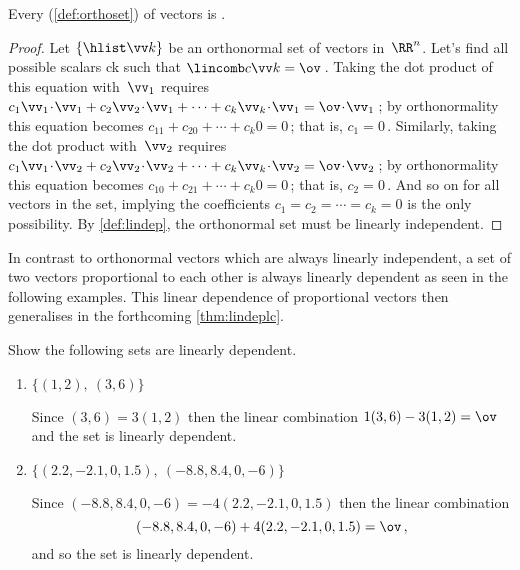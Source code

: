 \begin{theorem} \label{thm:ortholi}
Every  (\autoref{def:orthoset}) of vectors is .
\end{theorem}
\begin{proof} %
Let \(\{\hlist\vv k\}\) be an orthonormal set of vectors in~\(\RR^n\).
Let's find all possible scalars \hlist ck such that \(\lincomb c\vv k=\ov\)\,.
Taking the dot product of this equation with~\(\vv_1\) requires
\(c_1\vv_1\cdot\vv_1+c_2\vv_2\cdot\vv_1+\cdots+c_k\vv_k\cdot\vv_1=\ov\cdot\vv_1\)\,;
by orthonormality this equation becomes
\(c_11+c_20+\cdots+c_k0=0\)\,; that is, \(c_1=0\)\,.
Similarly, taking the dot product with~\(\vv_2\) requires
\(c_1\vv_1\cdot\vv_2+c_2\vv_2\cdot\vv_2+\cdots+c_k\vv_k\cdot\vv_2=\ov\cdot\vv_2\)\,;
by orthonormality this equation becomes
\(c_10+c_21+\cdots+c_k0=0\)\,; that is, \(c_2=0\)\,.
And so on for all vectors in the set, implying the coefficients \(c_1=c_2=\cdots=c_k=0\) is the only possibility.
By \autoref{def:lindep}, the orthonormal set must be linearly independent.
\end{proof}


In contrast to orthonormal vectors which are always linearly independent, a set of two vectors proportional to each other is always linearly dependent as seen in the following examples.
This linear dependence of proportional vectors then generalises in the forthcoming \autoref{thm:lindeplc}.




\begin{example} \label{eg:}
Show the following sets are linearly dependent.
\begin{enumerate}
\item \(\{(1,2),\ (3,6)\}\)
\begin{solution} 
Since \((3,6)=3(1,2)\) then the linear combination \(1(3,6)-3(1,2)=\ov\) and the set is linearly dependent. 
\end{solution}

\item \(\{(2.2,-2.1,0,1.5),\ (-8.8,8.4,0,-6)\}\)
\begin{solution} 
Since  \((-8.8,8.4,0,-6)=-4(2.2,-2.1,0,1.5)\) then the linear combination 
\begin{equation*}
(-8.8,8.4,0,-6)+4(2.2,-2.1,0,1.5)=\ov\,,
\end{equation*}
and so the set is linearly dependent.
\end{solution}
\end{enumerate}
\end{example}




